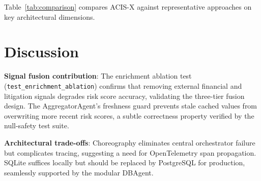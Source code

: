 \documentclass[runningheads]{llncs}
\begin{document}
Table~\ref{tab:comparison} compares ACIS-X against representative approaches on key architectural dimensions.

\begin{table}[H]
\caption{Architectural Comparison with Related Systems}
\label{tab:comparison}
\centering\small
{}
\end{table}

\section{Discussion}
\label{sec:discussion}

\textbf{Signal fusion contribution}: The enrichment ablation test (\texttt{test\allowbreak \_enrichment\allowbreak \_ablation}) confirms that removing external financial and litigation signals degrades risk score accuracy, validating the three-tier fusion design. The AggregatorAgent's freshness guard prevents stale cached values from overwriting more recent risk scores, a subtle correctness property verified by the null-safety test suite.

\textbf{Architectural trade-offs}: Choreography eliminates central orchestrator failure but complicates tracing, suggesting a need for OpenTelemetry span propagation. SQLite suffices locally but should be replaced by PostgreSQL for production, seamlessly supported by the modular DBAgent.
\end{document}
